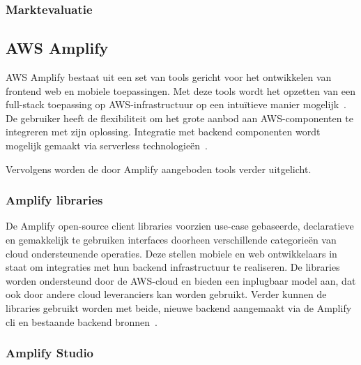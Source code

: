 \subsubsection{Marktevaluatie}



\subsection{AWS Amplify}
\label{sec:service-amplify}

AWS Amplify bestaat uit een set van tools gericht voor het ontwikkelen van frontend web en mobiele toepassingen.
Met deze tools wordt het opzetten van een full-stack toepassing op AWS-infrastructuur op een intuïtieve manier mogelijk~\autocite{AWSCopilotOverview}.
De gebruiker heeft de flexibiliteit om het grote aanbod aan AWS-componenten te integreren met zijn oplossing.
Integratie met backend componenten wordt mogelijk gemaakt via serverless technologieën~\autocite{Kandaswamy2022}.

Vervolgens worden de door Amplify aangeboden tools verder uitgelicht.

\subsubsection{Amplify libraries}

De Amplify open-source client libraries voorzien use-case gebaseerde, declaratieve en gemakkelijk te gebruiken interfaces
doorheen verschillende categorieën van cloud ondersteunende operaties.
Deze stellen mobiele en web ontwikkelaars in staat om integraties met hun backend infrastructuur te realiseren.
De libraries worden ondersteund door de AWS-cloud en bieden een inplugbaar model aan, dat ook door andere cloud leveranciers kan worden gebruikt.
Verder kunnen de libraries gebruikt worden met beide, nieuwe backend aangemaakt via de Amplify \acrshort{cli} en bestaande backend bronnen~\autocite{AWSAmplifyDocs}.

\subsubsection{Amplify Studio}

